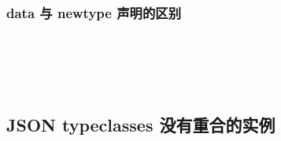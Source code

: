 \documentclass[./main.tex]{subfiles}
\begin{document}
\subsubsection*{data 与 newtype 声明的区别}



\begin{lstlisting}[language=Haskell]

\end{lstlisting}



\begin{lstlisting}[language=Haskell]

\end{lstlisting}



\begin{lstlisting}[language=Haskell]

\end{lstlisting}



\begin{lstlisting}[language=Haskell]

\end{lstlisting}



\begin{lstlisting}[language=Haskell]

\end{lstlisting}



\begin{lstlisting}[language=Haskell]

\end{lstlisting}

\subsection*{JSON typeclasses 没有重合的实例}



\begin{lstlisting}[language=Haskell]

\end{lstlisting}



\begin{lstlisting}[language=Haskell]

\end{lstlisting}



\begin{lstlisting}[language=Haskell]

\end{lstlisting}
\end{document}
